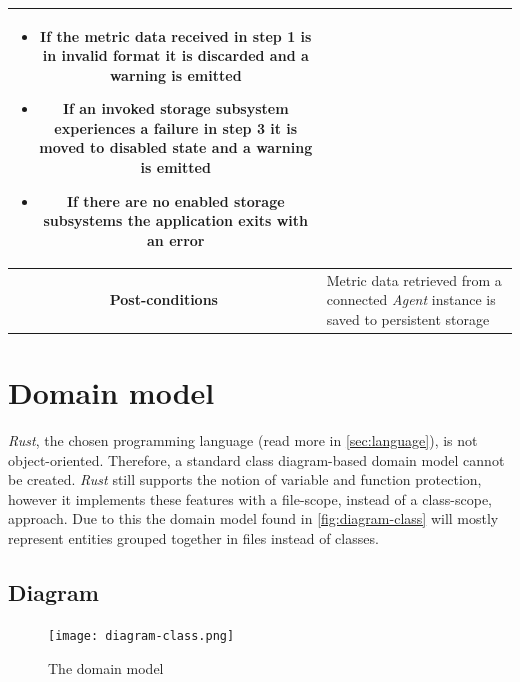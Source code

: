 \documentclass[12pt,a4paper,table]{article}
\begin{document}
\begin{longtable}{ |c|p{11.8cm}| }
                    \begin{itemize}
                        \item If the metric data received in step 1 is in invalid format it is discarded and a warning is emitted
                        \item If an invoked storage subsystem experiences a failure in step 3 it is moved to disabled state and a warning is emitted
                        \item If there are no enabled storage subsystems the application exits with an error
                    \end{itemize}\\ \hline
                \cellcolor[gray]{0.9} \textbf{Post-conditions} & Metric data retrieved from a connected \textit{Agent} instance is saved to persistent storage\\ \hline
            \end{longtable}

            

    \section{Domain model}
        \textit{Rust}, the chosen programming language (read more in \autoref{sec:language}), is not object-oriented. Therefore, a standard class diagram-based domain model cannot be created. \textit{Rust} still supports the notion of variable and function protection, however it implements these features with a file-scope, instead of a class-scope, approach. Due to this the domain model found in \autoref{fig:diagram-class} will mostly represent entities grouped together in files instead of classes.

        \subsection{Diagram}
            \begin{center}
                \begin{figure}[!h]
                    \texttt{[image: diagram-class.png]}
                    \caption{The domain model}
                    \label{fig:diagram-class}
                \end{figure}
            \end{center}
\end{document}
